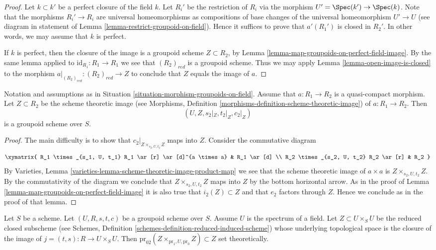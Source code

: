 \begin{proof}
Let $k \subset k'$ be a perfect closure of the field $k$.
Let $R_i'$ be the restriction of $R_i$ via the morphism
$U' = \Spec(k') \to \Spec(k)$. Note that the
morphisms $R_i' \to R_i$ are universal homeomorphisms as
compositions of base changes of the universal homeomorphism
$U' \to U$ (see diagram in statement of
Lemma \ref{lemma-restrict-groupoid-on-field}).
Hence it suffices to prove that $a'(R_1')$ is closed
in $R_2'$. In other words, we may assume that $k$ is perfect.

\medskip\noindent
If $k$ is perfect, then the closure of the image is
a groupoid scheme $Z \subset R_2$, by
Lemma \ref{lemma-map-groupoids-on-perfect-field-image}.
By the same lemma applied to
$\text{id}_{R_1} : R_1 \to R_1$
we see that $(R_2)_{red}$ is a groupoid scheme.
Thus we may apply
Lemma \ref{lemma-open-image-is-closed}
to the morphism
$a|_{(R_2)_{red}} : (R_2)_{red} \to Z$
to conclude that $Z$ equals the image of $a$.
\end{proof}

\begin{lemma}
\label{lemma-quasi-compact-map-groupoids-on-field-image}
Notation and assumptions as in
Situation \ref{situation-morphism-groupoids-on-field}.
Assume that $a : R_1 \to R_2$ is a quasi-compact morphism.
Let $Z \subset R_2$ be the scheme theoretic image (see
Morphisms, Definition \ref{morphisms-definition-scheme-theoretic-image})
of $a : R_1 \to R_2$. Then
$$
(U, Z, s_2|_Z, t_2|_Z, c_2|_Z)
$$
is a groupoid scheme over $S$.
\end{lemma}

\begin{proof}
The main difficulty is to show that $c_2|_{Z \times_{s_2, U, t_2} Z}$
maps into $Z$. Consider the commutative diagram
$$
\xymatrix{
R_1 \times_{s_1, U, t_1} R_1 \ar[r] \ar[d]^{a \times a} & R_1 \ar[d] \\
R_2 \times_{s_2, U, t_2} R_2 \ar[r] & R_2
}
$$
By
Varieties, Lemma \ref{varieties-lemma-scheme-theoretic-image-product-map}
we see that the scheme theoretic image of $a \times a$ is
$Z \times_{s_2, U, t_2} Z$. By the commutativity of the diagram we
conclude that $Z \times_{s_2, U, t_2} Z$ maps into $Z$ by the bottom
horizontal arrow. As in the proof of
Lemma \ref{lemma-map-groupoids-on-perfect-field-image}
it is also true that $i_2(Z) \subset Z$ and that
$e_2$ factors through $Z$. Hence we conclude as in the
proof of that lemma.
\end{proof}

\begin{lemma}
\label{lemma-groupoid-on-field-image}
Let $S$ be a scheme. Let $(U, R, s, t, c)$ be a groupoid scheme
over $S$. Assume $U$ is the spectrum of a field.
Let $Z \subset U \times_S U$ be the reduced closed subscheme (see
Schemes, Definition \ref{schemes-definition-reduced-induced-scheme})
whose underlying topological space is the closure of the image of
$j = (t, s) : R \to U \times_S U$. Then
$\text{pr}_{02}(Z \times_{\text{pr}_1, U, \text{pr}_0} Z) \subset Z$
set theoretically.
\end{lemma}

